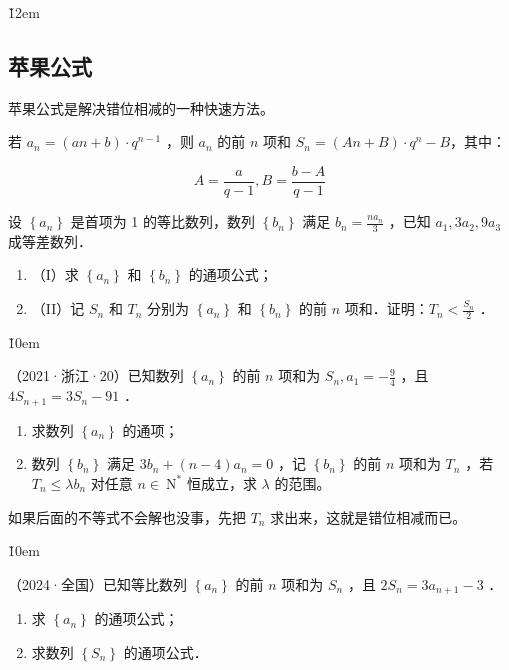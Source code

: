 \v{12em}

\subsection{苹果公式}

苹果公式是解决错位相减的一种快速方法。

\begin{theorem}[苹果公式]
    若 $a_n=(a n+b) \cdot q^{n-1}$ ，则 $a_n$ 的前 $n$ 项和 $S_n=(A n+B) \cdot q^n-B$，其中：

    $$A=\frac{a}{q-1}, B=\frac{b-A}{q-1}$$
\end{theorem}

\begin{example}
    设 $\left\{a_n\right\}$ 是首项为 1 的等比数列，数列 $\left\{b_n\right\}$ 满足 $b_n=\frac{n a_n}{3}$ ，已知 $a_1, 3 a_2, 9 a_3$ 成等差数列．
    \begin{enumerate}
        \item （I）求 $\left\{a_n\right\}$ 和 $\left\{b_n\right\}$ 的通项公式；
        \item （II）记 $S_n$ 和 $T_n$ 分别为 $\left\{a_n\right\}$ 和 $\left\{b_n\right\}$ 的前 $n$ 项和．证明：$T_n<\frac{S_n}{2}$ ．
    \end{enumerate}
\end{example}

\v{10em}

\begin{example}
    （2021·浙江·20）已知数列 $\left\{a_n\right\}$ 的前 $n$ 项和为 $S_n, a_1=-\frac{9}{4}$ ，且 $4 S_{n+1}=3 S_n-91$ ．
    \begin{enumerate}
        \item 求数列 $\left\{a_n\right\}$ 的通项；
        \item 数列 $\left\{b_n\right\}$ 满足 $3 b_n+(n-4) a_n=0$ ，记 $\left\{b_n\right\}$ 的前 $n$ 项和为 $T_n$ ，若 $T_n \leq \lambda b_n$ 对任意 $n \in \mathrm{~N}^*$ 恒成立，求 $\lambda$ 的范围。
    \end{enumerate}
\end{example}

\begin{tips}
    如果后面的不等式不会解也没事，先把 $T_n$ 求出来，这就是错位相减而已。
\end{tips}

\v{10em}

\begin{example}
    （2024·全国）已知等比数列 $\left\{a_n\right\}$ 的前 $n$ 项和为 $S_n$ ，且 $2 S_n=3 a_{n+1}-3$ ．
    \begin{enumerate}
        \item 求 $\left\{a_n\right\}$ 的通项公式；

        \item 求数列 $\left\{S_n\right\}$ 的通项公式．
    \end{enumerate}
\end{example}

